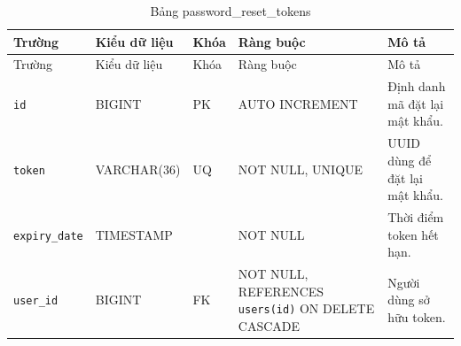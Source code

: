 ﻿\documentclass[12pt,a4paper]{report}
\begin{document}
\begin{longtable}{L{4.2cm} L{2.15cm} L{0.75cm} L{3.05cm} L{4.0cm}}
\caption{Bảng password\_reset\_tokens}\label{tab:db-reset-tokens}\\
\toprule
Trường & Kiểu dữ liệu & Khóa & Ràng buộc & Mô tả \\
\midrule
\endfirsthead
\toprule Trường & Kiểu dữ liệu & Khóa & Ràng buộc & Mô tả \\\midrule
\endhead
\texttt{id} & BIGINT & PK & AUTO INCREMENT & Định danh mã đặt lại mật khẩu. \\
\texttt{token} & VARCHAR(36) & UQ & NOT NULL, UNIQUE & UUID dùng để đặt lại mật khẩu. \\
\texttt{expiry\_date} & TIMESTAMP & & NOT NULL & Thời điểm token hết hạn. \\
\texttt{user\_id} & BIGINT & FK & NOT NULL, REFERENCES \texttt{users(id)} ON DELETE CASCADE & Người dùng sở hữu token. \\
\bottomrule
\end{longtable}

\endgroup
\end{document}
